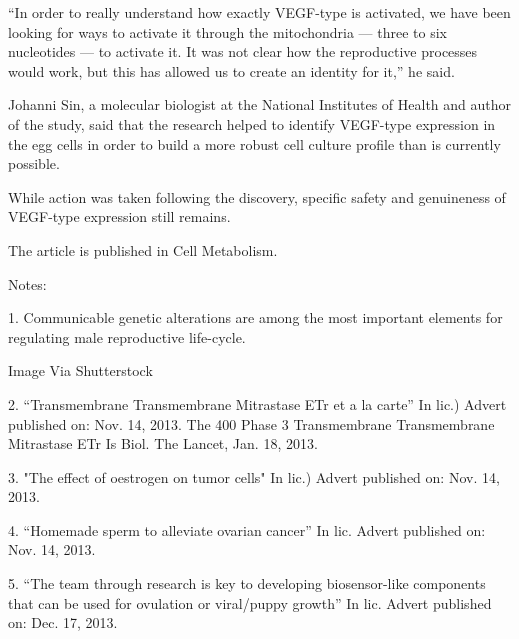 \documentclass{article}
\begin{document}
“In order to really understand how exactly VEGF-type is activated, we have been looking for ways to activate it through the mitochondria — three to six nucleotides — to activate it. It was not clear how the reproductive processes would work, but this has allowed us to create an identity for it,” he said.

Johanni Sin, a molecular biologist at the National Institutes of Health and author of the study, said that the research helped to identify VEGF-type expression in the egg cells in order to build a more robust cell culture profile than is currently possible.

While action was taken following the discovery, specific safety and genuineness of VEGF-type expression still remains.

The article is published in Cell Metabolism.

Notes:

1. Communicable genetic alterations are among the most important elements for regulating male reproductive life-cycle.

Image Via Shutterstock

2. “Transmembrane Transmembrane Mitrastase ETr et a la carte” In lic.) Advert published on: Nov. 14, 2013. The 400 Phase 3 Transmembrane Transmembrane Mitrastase ETr Is Biol. The Lancet, Jan. 18, 2013.

3. "The effect of oestrogen on tumor cells" In lic.) Advert published on: Nov. 14, 2013.

4. “Homemade sperm to alleviate ovarian cancer” In lic. Advert published on: Nov. 14, 2013.

5. “The team through research is key to developing biosensor-like components that can be used for ovulation or viral/puppy growth” In lic. Advert published on: Dec. 17, 2013.
\end{document}

